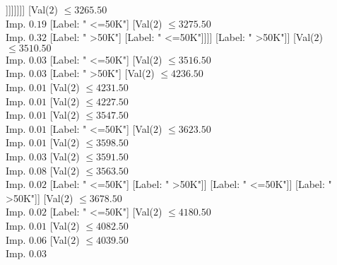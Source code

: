 \documentclass[margin=10pt]{standalone}
\begin{document}
\begin{forest}
																																		[Val($2$) $ \leq 3225.50$ \\ Imp. $0.25$
																																			[Label: " <=50K"]
																																			[Label: " >50K"]]]]]]]]
																												[Val($2$) $ \leq 3265.50$ \\ Imp. $0.19$
																													[Label: " <=50K"]
																													[Val($2$) $ \leq 3275.50$ \\ Imp. $0.32$
																														[Label: " >50K"]
																														[Label: " <=50K"]]]]
																											[Label: " >50K"]]
																										[Val($2$) $ \leq 3510.50$ \\ Imp. $0.03$
																											[Label: " <=50K"]
																											[Val($2$) $ \leq 3516.50$ \\ Imp. $0.03$
																												[Label: " >50K"]
																												[Val($2$) $ \leq 4236.50$ \\ Imp. $0.01$
																													[Val($2$) $ \leq 4231.50$ \\ Imp. $0.01$
																														[Val($2$) $ \leq 4227.50$ \\ Imp. $0.01$
																															[Val($2$) $ \leq 3547.50$ \\ Imp. $0.01$
																																[Label: " <=50K"]
																																[Val($2$) $ \leq 3623.50$ \\ Imp. $0.01$
																																	[Val($2$) $ \leq 3598.50$ \\ Imp. $0.03$
																																		[Val($2$) $ \leq 3591.50$ \\ Imp. $0.08$
																																			[Val($2$) $ \leq 3563.50$ \\ Imp. $0.02$
																																				[Label: " <=50K"]
																																				[Label: " >50K"]]
																																			[Label: " <=50K"]]
																																		[Label: " >50K"]]
																																	[Val($2$) $ \leq 3678.50$ \\ Imp. $0.02$
																																		[Label: " <=50K"]
																																		[Val($2$) $ \leq 4180.50$ \\ Imp. $0.01$
																																			[Val($2$) $ \leq 4082.50$ \\ Imp. $0.06$
																																				[Val($2$) $ \leq 4039.50$ \\ Imp. $0.03$

\end{forest}
\end{document}
